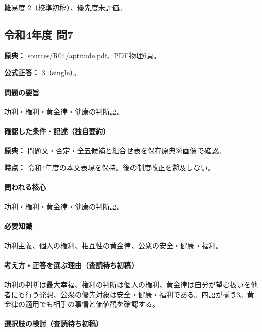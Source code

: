 \par 難易度 2（校準初稿）、優先度未評価。

\subsection{令和4年度 問7}
\label{q:r04-reg-apt-07}

\noindent\textbf{原典：} sources/R04/aptitude.pdf、PDF物理6頁。

\textbf{公式正答：} 3（single）。

\paragraph{問題の要旨} 功利・権利・黄金律・健康の判断語。

\paragraph{確認した条件・記述（独自要約）}\mbox{}\par

\noindent\textbf{原典：} 問題文・否定・全五候補と組合せ表を保存原典36画像で確認。\par

\noindent\textbf{時点：} 令和4年度の本文表現を保持。後の制度改正を遡及しない。\par

\paragraph{問われる核心} 功利・権利・黄金律・健康の判断語。

\paragraph{必要知識} 功利主義、個人の権利、相互性の黄金律、公衆の安全・健康・福利。

\paragraph{考え方・正答を選ぶ理由（査読待ち初稿）} 功利の判断は最大幸福、権利の判断は個人の権利、黄金律は自分が望む扱いを他者にも行う発想、公衆の優先対象は安全・健康・福利である。四語が揃う3。黄金律の適用でも相手の事情と価値観を確認する。

\paragraph{選択肢の検討（査読待ち初稿）}\mbox{}\par

